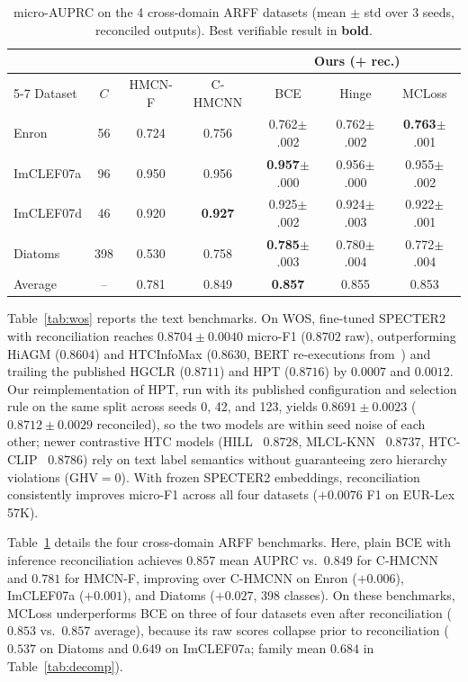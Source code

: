 \documentclass[conference]{IEEEtran}
\begin{document}
\begin{table}[t]
\caption{micro-AUPRC on the 4 cross-domain ARFF datasets (mean $\pm$ std over 3
seeds, reconciled outputs). Best verifiable result in \textbf{bold}.}
\label{tab:others}
\centering
\footnotesize
\setlength{\tabcolsep}{1.5pt}
\begin{tabular}{lcccccc}
\toprule
& & & & \multicolumn{3}{c}{Ours (+ rec.)} \\
\cmidrule(lr){5-7}
Dataset & $C$ & HMCN-F & C-HMCNN & BCE & Hinge & MCLoss \\
\midrule
Enron & 56 & 0.724 & 0.756 & 0.762{\scriptsize$\pm$.002} & 0.762{\scriptsize$\pm$.002} & \textbf{0.763}{\scriptsize$\pm$.001} \\
ImCLEF07a & 96 & 0.950 & 0.956 & \textbf{0.957}{\scriptsize$\pm$.000} & 0.956{\scriptsize$\pm$.000} & 0.955{\scriptsize$\pm$.002} \\
ImCLEF07d & 46 & 0.920 & \textbf{0.927} & 0.925{\scriptsize$\pm$.002} & 0.924{\scriptsize$\pm$.003} & 0.922{\scriptsize$\pm$.001} \\
Diatoms & 398 & 0.530 & 0.758 & \textbf{0.785}{\scriptsize$\pm$.003} & 0.780{\scriptsize$\pm$.004} & 0.772{\scriptsize$\pm$.004} \\
\midrule
Average & -- & 0.781 & 0.849 & \textbf{0.857} & 0.855 & 0.853 \\
\bottomrule
\end{tabular}
\end{table}

Table~\ref{tab:wos} reports the text benchmarks. On WOS, fine-tuned
SPECTER2~\cite{specter2} with reconciliation reaches $0.8704 \pm 0.0040$
micro-F1 ($0.8702$ raw), outperforming HiAGM ($0.8604$) and HTCInfoMax
($0.8630$, BERT re-executions from~\cite{hpt}) and trailing the published
HGCLR ($0.8711$) and HPT ($0.8716$) by $0.0007$ and $0.0012$. Our
reimplementation of HPT, run with its published configuration and selection
rule on the same split across seeds 0, 42, and 123, yields $0.8691 \pm 0.0023$
($0.8712 \pm 0.0029$ reconciled), so the two models are within seed noise of
each other; newer contrastive HTC models (HILL~\cite{hill2024} $0.8728$,
MLCL-KNN~\cite{mlclknn2024} $0.8737$, HTC-CLIP~\cite{htcclip2023} $0.8786$) rely
on text label semantics without guaranteeing zero hierarchy violations
($\text{GHV}=0$). With frozen
SPECTER2 embeddings, reconciliation consistently improves micro-F1 across all
four datasets ($+0.0076$ F1 on EUR-Lex 57K).

Table~\ref{tab:others} details the four cross-domain ARFF benchmarks. Here,
plain BCE with inference reconciliation achieves $0.857$ mean AUPRC vs.\
$0.849$ for C-HMCNN and $0.781$ for HMCN-F, improving over C-HMCNN on Enron
($+0.006$), ImCLEF07a ($+0.001$), and Diatoms ($+0.027$, 398 classes). On these benchmarks, MCLoss underperforms BCE on
three of four datasets even after reconciliation ($0.853$ vs.\ $0.857$ average),
because its raw scores collapse prior to reconciliation ($0.537$ on Diatoms and
$0.649$ on ImCLEF07a; family mean $0.684$ in Table~\ref{tab:decomp}).
\end{document}
